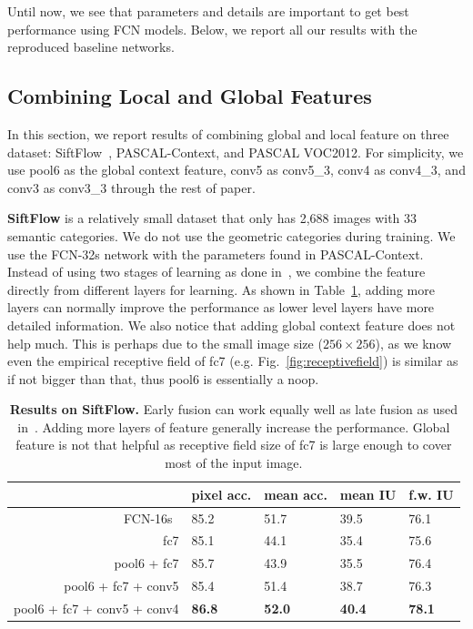 \documentclass{article} %
\begin{document}
Until now, we see that parameters and details are important to get best performance using FCN models. Below, we report all our results with the reproduced baseline networks.

\subsection{Combining Local and Global Features}
\label{sec:normalize}
In this section, we report results of combining global and local feature on three dataset: SiftFlow~\cite{liu2011nonparametric}, PASCAL-Context, and PASCAL VOC2012. For simplicity, we use pool6 as the global context feature, conv5 as conv5\_3, conv4 as conv4\_3, and conv3 as conv3\_3 through the rest of paper.

\noindent\textbf{SiftFlow} is a relatively small dataset that only has 2,688 images with 33 semantic categories. We do not use the geometric categories during training. We use the FCN-32s network with the parameters found in PASCAL-Context. Instead of using two stages of learning as done in~\cite{long2014fully}, we combine the feature directly from different layers for learning. As shown in Table~\ref{tab:siftflow}, adding more layers can normally improve the performance as lower level layers have more detailed information. We also notice that adding global context feature does not help much. This is perhaps due to the small image size ($256\times 256$), as we know even the empirical receptive field of fc7 (e.g. Fig.~\ref{fig:receptivefield}) is similar as if not bigger than that, thus pool6 is essentially a noop.
\begin{table}[!htb]
	\centering
	\begin{tabular}{r|p{1.5em}p{1.5em}p{1.5em}p{1.5em}}
		& pixel acc. & mean acc. & mean IU & f.w. IU\\
		\hline\hline
		FCN-16s~\cite{long2014fully} & 85.2 & 51.7 & 39.5 & 76.1\\
		\hline
		fc7 & 85.1 & 44.1 & 35.4 & 75.6\\
		pool6 + fc7 & 85.7 & 43.9 & 35.5 & 76.4\\
		pool6 + fc7 + conv5 & 85.4 & 51.4 & 38.7 & 76.3\\
		pool6 + fc7 + conv5 + conv4 & \textbf{86.8} & \textbf{52.0} & \textbf{40.4} & \textbf{78.1}\\
		\hline
	\end{tabular}
	\caption{\textbf{Results on SiftFlow.} Early fusion can work equally well as late fusion as used in~\cite{long2014fully}. Adding more layers of feature generally increase the performance. Global feature is not that helpful as receptive field size of fc7 is large enough to cover most of the input image.}\label{tab:siftflow}
\end{table}
\vspace{-0.5em}
\end{document}
